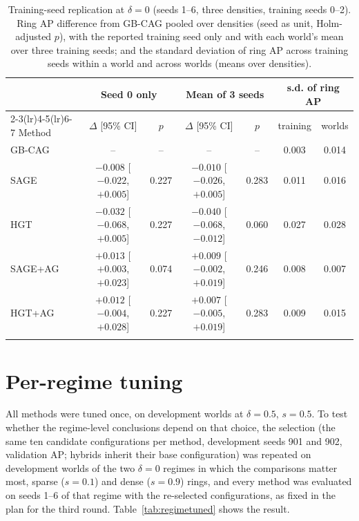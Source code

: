 \documentclass[pdflatex,sn-vancouver-num]{sn-jnl}
\begin{document}
\begin{table}[h]
\caption{Training-seed replication at $\delta=0$ (seeds 1--6, three densities, training seeds 0--2). Ring AP difference from GB-CAG pooled over densities (seed as unit, Holm-adjusted $p$), with the reported training seed only and with each world's mean over three training seeds; and the standard deviation of ring AP across training seeds within a world and across worlds (means over densities).}\label{tab:modelseeds}
\scriptsize
\setlength{\tabcolsep}{2pt}
\begin{tabular}{@{}lcccccc@{}}
\toprule
 & \multicolumn{2}{c}{Seed 0 only} & \multicolumn{2}{c}{Mean of 3 seeds} & \multicolumn{2}{c}{s.d. of ring AP} \\
\cmidrule(lr){2-3}\cmidrule(lr){4-5}\cmidrule(lr){6-7}
Method & $\Delta$ [95\% CI] & $p$ & $\Delta$ [95\% CI] & $p$ & training & worlds \\
\midrule
GB-CAG & -- & -- & -- & -- & 0.003 & 0.014 \\
SAGE & $-0.008$ [$-0.022$, $+0.005$] & 0.227 & $-0.010$ [$-0.026$, $+0.005$] & 0.283 & 0.011 & 0.016 \\
HGT & $-0.032$ [$-0.068$, $+0.005$] & 0.227 & $-0.040$ [$-0.068$, $-0.012$] & 0.060 & 0.027 & 0.028 \\
SAGE+AG & $+0.013$ [$+0.003$, $+0.023$] & 0.074 & $+0.009$ [$-0.002$, $+0.019$] & 0.246 & 0.008 & 0.007 \\
HGT+AG & $+0.012$ [$-0.004$, $+0.028$] & 0.227 & $+0.007$ [$-0.005$, $+0.019$] & 0.283 & 0.009 & 0.015 \\
\botrule
\end{tabular}
\end{table}

\section{Per-regime tuning}\label{sec:s_regime}
All methods were tuned once, on development worlds at $\delta=0.5$, $s=0.5$. To test whether the regime-level
conclusions depend on that choice, the selection (the same ten candidate configurations per method, development
seeds 901 and 902, validation AP; hybrids inherit their base configuration) was repeated on development worlds of the two
$\delta=0$ regimes in which the comparisons matter most, sparse ($s=0.1$) and dense ($s=0.9$) rings, and every
method was evaluated on seeds 1--6 of that regime with the re-selected configurations, as fixed in the plan for the
third round. Table~\ref{tab:regimetuned} shows the result.
\end{document}
